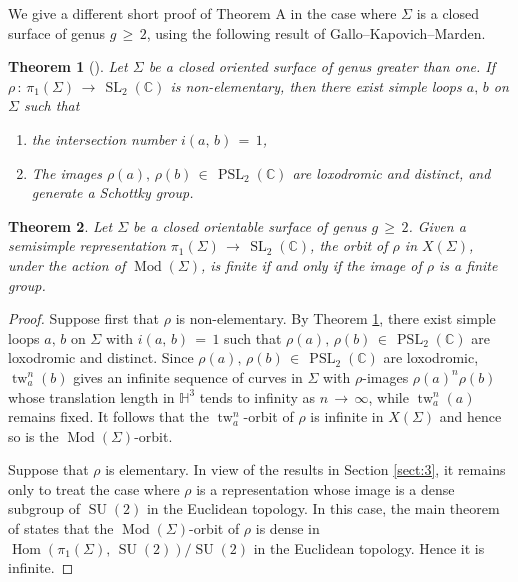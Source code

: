 \documentclass[reqno]{amsart}
\theoremstyle{plain}
\newtheorem{theorem}{Theorem}[section]
\theoremstyle{definition}
\theoremstyle{remark}
\newcommand{\C}{{\mathbb{C}}}
\renewcommand{\S}{{\Sigma}}
\DeclareMathOperator{\Hom}{Hom}
\DeclareMathOperator{\Mod}{Mod}
\DeclareMathOperator{\PSL}{PSL}
\DeclareMathOperator{\SL}{SL}
\DeclareMathOperator{\SU}{SU}
\DeclareMathOperator{\tw}{tw}
\newcommand\HHH{{\mathbb H}}
\begin{document}
We give a different short proof of Theorem A in the case where $\Sigma$ is a closed surface of genus $g\,\geq\,2$, 
using the following result of Gallo--Kapovich--Marden.

\begin{theorem}[{\cite[Section 3]{gkm}}]\label{gkm} Let $\S$ be a closed oriented surface of genus greater than one.
If  $\rho\,:\,\pi_1(\Sigma)\,\to\,\SL_2(\C)$ is non-elementary, then there exist simple loops $a,\, b$ on $\S$
such that 
\begin{enumerate}
\item the intersection number $i(a,\,b) \,=\, 1$,

\item The images $\rho(a), \,\rho(b)\,\in \,\PSL_2(\C)$ are loxodromic and distinct, and generate a Schottky group.
	\end{enumerate}
\end{theorem}

\begin{theorem}\label{rgg} Let $\S$ be a closed orientable surface of genus $g\,\geq\,2$.
Given a semisimple representation $\pi_1(\Sigma)\,\to\,\SL_2(\C)$, the orbit
of $\rho$ in $X(\Sigma)$, under the action of $\Mod(\Sigma)$, is finite if and only if the image
of $\rho$ is a finite group.
\end{theorem}

\begin{proof}
Suppose first that $\rho$ is non-elementary. By Theorem \ref{gkm}, there exist simple loops $a,\, b$ on $\S$
with $i(a,\,b)\, =\, 1$ such that $\rho(a), \,\rho(b)
\,\in\, \PSL_2(\C)$ are loxodromic and distinct. Since $\rho(a),\, \rho(b)\,\in\, \PSL_2(\C)$ are loxodromic,
$\tw_a^n (b)$ gives an infinite sequence of curves in $\Sigma$ with $\rho$-images $\rho(a)^n \rho(b)$ whose
translation length in $\HHH^3$ tends to infinity as $n\,\to\, \infty$, while $\tw_a^n (a)$ remains fixed. It
follows that the $\tw_a^n$-orbit of $\rho$ is infinite in $X(\Sigma)$ and hence so is the $\Mod(\Sigma)$-orbit.

Suppose that $\rho$ is elementary. In view of the results in Section \ref{sect:3}, it remains only to treat the 
case where $\rho$ is a representation whose image is a dense subgroup of $\SU(2)$ in the Euclidean topology. In 
this case, the main theorem of \cite{px} states that the $\Mod(\Sigma)$-orbit of $\rho$ is dense in 
$\Hom(\pi_1(\Sigma),\,\SU(2))/\SU(2)$ in the Euclidean topology. Hence it is infinite.
\end{proof}
\end{document}
